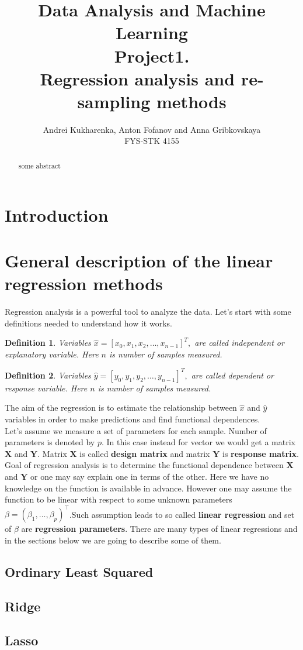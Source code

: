 \documentclass[10pt]{article}
\newtheorem{defn}{Definition}
\begin{document}
\setlength\parindent{1pt}
\title{Data Analysis and Machine Learning \\
Project1.\\ Regression analysis and re-sampling methods}
\author{Andrei Kukharenka, Anton Fofanov and Anna Gribkovskaya \\  
FYS-STK 4155 
}

\maketitle
\begin{abstract}
some abstract
\end{abstract}
\clearpage 


\section{Introduction}


\section{General description of the linear regression methods}
Regression analysis is a powerful tool to analyze the data. Let's start with some definitions needed to understand how it works.
\begin{defn}
Variables $\hat{x} = [x_0,x_1, x_2,\dots, x_{n-1}]^T,$ are called independent  or explanatory variable. Here $n$ is number of samples measured.
\end{defn}

\begin{defn}
	Variables  $\hat{y} = [y_0,y_1, y_2,\dots, y_{n-1}]^T,$ are called dependent or response variable. Here $n$ is number of samples measured.
\end{defn}
The aim of the regression is to estimate the relationship between $\hat{x}$ and $\hat{y}$ variables in order to make predictions and find functional dependences. \\
Let's assume we measure a set of parameters for each sample. Number of parameters is denoted by $p$. In this case instead for vector we would get a matrix $\textbf{X}$ and $\textbf{Y}$. Matrix $\textbf{X}$ is called \textbf{design matrix} and matrix $\textbf{Y}$ is \textbf{response matrix}. Goal of regression analysis is to determine the functional dependence between $\textbf{X}$ and $\textbf{Y}$ or one may say explain one in terms of the other. Here we have no knowledge on the function is available in advance. However one may assume the function to be linear with respect to some unknown parameters $\beta = (\beta_1, \ldots, \beta_p)^{\top}$.Such assumption leads to so called \textbf{linear regression} and set of $\beta$  are \textbf{regression parameters}. There are many types of linear regressions and in the sections below we are going to describe some of them.
\subsection{Ordinary Least Squared}

\subsection{Ridge}

\subsection{Lasso}
\end{document}
